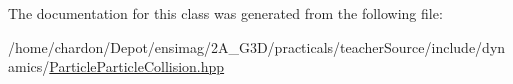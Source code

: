 The documentation for this class was generated from the following file\+:\begin{DoxyCompactItemize}
\item 
/home/chardon/\+Depot/ensimag/2\+A\+\_\+\+G3\+D/practicals/teacher\+Source/include/dynamics/\hyperlink{ParticleParticleCollision_8hpp}{Particle\+Particle\+Collision.\+hpp}\end{DoxyCompactItemize}
